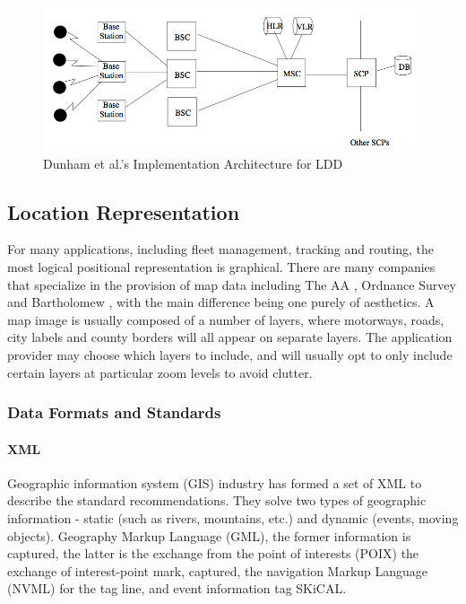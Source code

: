 \documentclass[12pt,a4paper]{article}
\begin{document}
\begin{figure}
\centering
\includegraphics[width=.85\textwidth]{fig/Dunham_LDD}
\caption{Dunham et al.'s Implementation Architecture for LDD}
\label{fig:dunham_ldd}
\end{figure}

\subsection{Location Representation} %
\label{sub:location_representation}
For many applications, including fleet management, tracking and routing, the most logical positional representation is graphical. There are many companies that specialize in the provision of map data including The AA \cite{theaa}, Ordnance Survey \cite{ordnance} and Bartholomew \cite{bartholomew}, with the main difference being one purely of aesthetics. A map image is usually composed of a number of layers, where motorways, roads, city labels and county borders will all appear on separate layers. The application provider may choose which layers to include, and will usually opt to only include certain layers at particular zoom levels to avoid clutter. \cite{DRoza:2003wz}

\subsubsection{Data Formats and Standards} %
\label{ssub:data_formats_and_standards}
\paragraph{XML} %
\label{par:xml}
Geographic information system (GIS) industry has formed a set of XML to describe the standard recommendations. They solve two types of geographic information - static (such as rivers, mountains, etc.) and dynamic (events, moving objects). Geography Markup Language (GML), the former information is captured, the latter is the exchange from the point of interests (POIX) the exchange of interest-point mark, captured, the navigation Markup Language (NVML) for the tag line, and event information tag SKiCAL. \cite{DRoza:2003wz}
\end{document}
